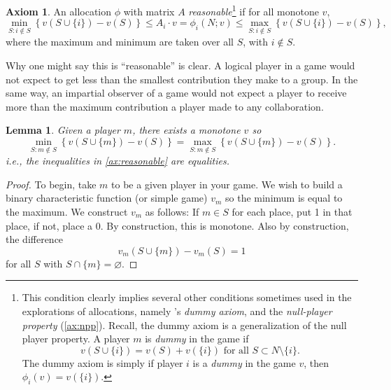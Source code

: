 \documentclass[12pt,letterpaper,final]{article}
\theoremstyle{plain}
\theoremstyle{plain}
\theoremstyle{plain}
\newtheorem{lemma}[theorem]{Lemma}
\theoremstyle{plain}
\theoremstyle{plain}
\theoremstyle{plain}
\theoremstyle{plain}
\theoremstyle{definition}
\theoremstyle{definition}
\theoremstyle{definition}
\theoremstyle{definition}
\theoremstyle{definition}
\newtheorem{axiom}{Axiom}[section]
\theoremstyle{remark}
\theoremstyle{remark}
\theoremstyle{remark}
\theoremstyle{remark}
\begin{document}
\begin{axiom}\label{def:reasonable}\label{ax:reasonable}
  An allocation \(\phi\) with matrix \(A\)
  \emph{reasonable}\footnote{This 
    condition clearly implies several other conditions sometimes used
    in the explorations of allocations, namely \citeauthor{Weber78}'s
    \emph{dummy axiom}, and the \emph{null-player property}
    (\cref{ax:npp}). Recall, the dummy axiom is a
    generalization of the null player property.
    A player \(m\) is \emph{dummy} in the game if
    \[
      v(S\cup \{i\}) = v(S) + v(\{i\}) \text{ for all } S \subset
      N\setminus\{i\}.
    \]
    The dummy axiom is simply
    if player \(i\) is a \emph{dummy} in the game \(v\), then
    \(\phi_i(v)=v(\{i\})\).
  }
  if for all monotone \(v\),
  \begin{equation}\label{def:reasonablebounds}
    \min_{S: i\notin S}\left\{ v\left(S \cup\{i\}\right) -v(S)\right\}
    \leq A_i\cdot v = \phi_i(N;v) \leq \max_{S: i \notin
      S}\left\{v\left(S \cup \{i\}\right) - v(S)\right\},   
  \end{equation}
  where the maximum and minimum are taken over all \(S\), with \(i\notin S\).  
\end{axiom}

Why one might say this is ``reasonable'' is clear. A logical player
in a game would not expect to get less than the smallest contribution
they make to a group. In the same way, an impartial observer of a game
would not expect a player to receive more than the maximum
contribution a player made to any collaboration.



\begin{lemma}\label{lem:maxplayergains}
  Given a player \(m\), there exists a monotone \(v\) so
  \[
    \min_{S:m \notin S}\left\{ v\left(S\cup\{m\}\right) - v(S)\right\} =
    \max_{S:m\notin S}\left\{v\left(S \cup \{m\}\right) - v(S)\right\}.    
  \]
  i.e., the inequalities in \cref{ax:reasonable} are equalities.
\end{lemma}

\begin{proof}
  To begin, take \(m\) to be a given player in your game. We wish to
  build a binary characteristic function (or simple game) \(v_m\) so the minimum is equal
  to the maximum. We construct \(v_m\) as follows: If \(m \in S\) for each
  place, put 1 in that place, if not, place a 0. By construction, this
  is monotone. Also by construction, the difference
  \[v_m\left(S\cup\{m\}\right)-v_m(S) = 1\] for all \(S\) with
  \(S\cap\{m\} = \varnothing\). 
\end{proof}
\end{document}
